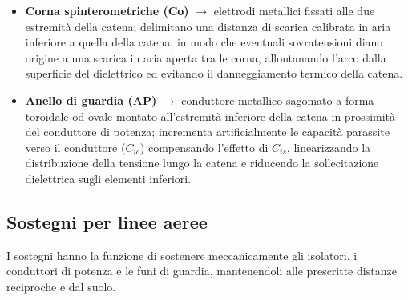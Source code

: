 \begin{itemize}
    \item \textbf{Corna spinterometriche (Co)} $\rightarrow$ elettrodi metallici fissati alle due estremità della catena; delimitano una distanza di scarica calibrata in aria inferiore a quella della catena, in modo che eventuali sovratensioni diano origine a una scarica in aria aperta tra le corna, allontanando l'arco dalla superficie del dielettrico ed evitando il danneggiamento termico della catena.
    \item \textbf{Anello di guardia (AP)} $\rightarrow$ conduttore metallico sagomato a forma toroidale od ovale montato all'estremità inferiore della catena in prossimità del conduttore di potenza; incrementa artificialmente le capacità parassite verso il conduttore ($C_{ic}$) compensando l'effetto di $C_{is}$, linearizzando la distribuzione della tensione lungo la catena e riducendo la sollecitazione dielettrica sugli elementi inferiori.
\end{itemize}

\subsection{Sostegni per linee aeree}
I sostegni hanno la funzione di sostenere meccanicamente gli isolatori, i conduttori di potenza e le funi di guardia, mantenendoli alle prescritte distanze reciproche e dal suolo.

